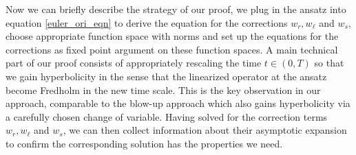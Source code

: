 \documentclass[letterpaper,11pt]{article}
\numberwithin{equation}{section}
\theoremstyle{plain}
\begin{document}
Now we can briefly describe the strategy of our proof, we plug in the ansatz into equation \eqref{euler_ori_eqn} to derive the equation for the corrections $w_r, w_\ell $ and $w_s$, choose appropriate function space with norms and set up the equations for the corrections as fixed point argument on these function spaces. A main technical part of our proof consists of appropriately rescaling the time $t \in (0,T)$ so that we gain hyperbolicity in the sense that the linearized operator at the ansatz become Fredholm in the new time scale. This is the key observation in our approach, comparable to the blow-up approach which also gains hyperbolicity via a carefully chosen change of variable. Having solved for the correction terms $w_r, w_\ell$ and $w_s$, we can then collect information about their asymptotic expansion to confirm the corresponding solution has the properties we need.
\end{document}
